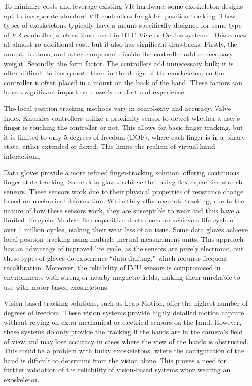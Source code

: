 \bigskip \noindent
To minimize costs and leverage existing VR hardware, some exoskeleton designs opt to incorporate standard VR controllers for global position tracking. These types of exoskeletons typically have a mount specifically designed for some type of VR controller, such as those used in HTC Vive or Oculus systems. This comes at almost no additional cost, but it also has significant drawbacks. Firstly, the mount, buttons, and other components inside the controller add unnecessary weight. Secondly, the form factor. The controllers add unnecessary bulk; it is often difficult to incorporate them in the design of the exoskeleton, so the controller is often placed in a mount on the back of the hand. These factors can have a significant impact on a user's comfort and experience.

\bigskip \noindent
The local position tracking methods vary in complexity and accuracy. Valve Index Knuckles controllers utilize a proximity sensor to detect whether a user's finger is touching the controller or not. This allows for basic finger tracking, but it is limited to only 5 degrees of freedom (DOF), where each finger is in a binary state, either extended or flexed. This limits the realism of virtual hand interactions.

\bigskip \noindent
Data gloves provide a more refined finger-tracking solution, offering continuous finger-state tracking. Some data gloves \cite{mi14112050} achieve that using flex capacitive stretch sensors. These sensors work due to their physical properties of resistance change based on mechanical deformation. While they offer accurate tracking, due to the nature of how these sensors work, they are susceptible to wear and thus have a limited life cycle. Modern flex capacitive stretch sensors achieve a life cycle of over 1 million cycles, making their wear less of an issue. Some data gloves \cite{articleIMU} achieve local position tracking using multiple inertial measurement units. This approach has an advantage of improved life cycle, as the sensors are purely electronic, but these types of gloves do experience “data drifting,” which requires frequent recalibration. Moreover, the reliability of IMU sensors is compromised in environments with strong or nearby magnetic fields, making them unreliable to use with motor-based exoskeletons.

\bigskip \noindent
Vision-based tracking solutions, such as Leap Motion, offer the highest number of degrees of freedom. These vision systems provide highly detailed motion capture without relying on extra mechanical or electrical sensors on the hand. However, these systems do only provide the tracking if the hands are in the camera's field of view and may lose accuracy in cases where the view of the hands is obstructed. This could be a problem with bulky exoskeletons, where the configuration of the hand is difficult to determine from the vision alone. This proves a need for further validation of the reliability of vision-based systems when wearing an exoskeleton.

